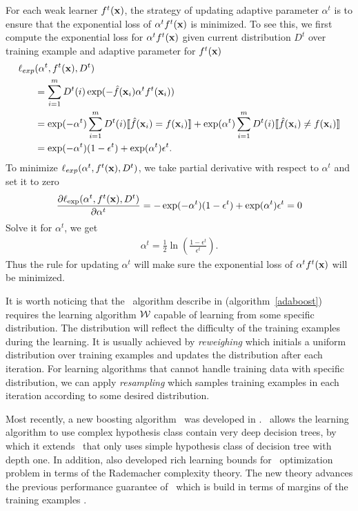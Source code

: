{For each weak learner $f^t(\mathbf {x})$, the strategy of updating adaptive parameter $\alpha^t$ is to ensure that the exponential loss of $\alpha^tf^t(\mathbf {x})$ is minimized.
To see this, we first compute the exponential loss for $\alpha^tf^t(\mathbf {x})$ given current distribution $D^t$ over training example and adaptive parameter for $f^t(\mathbf {x})$
\begin{align*}
	\ell_{exp}&(\alpha^t,f^t(\mathbf {x}),D^t) \\
	&= \sum_{i=1}^mD^t(i)\exp(-{\hat{f}}(\mathbf {x}_i)\alpha^tf^t(\mathbf {x}_i))\\
	&=\exp(-\alpha^t)\sum_{i=1}^mD^t(i){\llbracket {\hat{f}}(\mathbf {x}_i)=f(\mathbf {x}_i) \rrbracket} + \exp(\alpha^t)\sum_{i=1}^mD^t(i){\llbracket {\hat{f}}(\mathbf {x}_i)\neq f(\mathbf {x}_i) \rrbracket}\\
	&=\exp(-\alpha^t)(1-\epsilon^t) + \exp(\alpha^t)\epsilon^t.
\end{align*}
To minimize $\ell_{exp}(\alpha^t,f^t(\mathbf {x}),D^t)$, we take partial derivative with respect to $\alpha^t$ and set it to zero
\begin{align*}
	\frac{\partial\ell_{\exp}(\alpha^t,f^t(\mathbf {x}),D^t)}{\partial\alpha^t} = -\exp(-\alpha^t)(1-\epsilon^t) + \exp(\alpha^t)\epsilon^t=0
\end{align*}
Solve it for $\alpha^t$, we get
\begin{align*}
	\alpha^{t} = \frac{1}{2}\ln\left(\frac{1-\epsilon^t}{\epsilon^t}\right).
\end{align*}
Thus the rule for updating $\alpha^t$ will make sure the exponential loss of $\alpha^tf^t(\mathbf {x})$ will be minimized.

It is worth noticing that the \adaboost\ algorithm describe in (algorithm~\ref{adaboost}) requires the learning algorithm $\mathcal{W}$ capable of learning from some specific distribution.
The distribution will reflect the difficulty of the training examples during the learning.
It is usually achieved by \textit{reweighing} which initials a uniform distribution over training examples and updates the distribution after each iteration.
For learning algorithms that cannot handle training data with specific distribution, we can apply \textit{resampling} which samples training examples in each iteration according to some desired distribution.

Most recently, a new boosting algorithm \deepboosting\ was developed in \citep{Cortes14deep}.
\deepboosting\ allows the learning algorithm to use complex hypothesis class contain very deep decision trees, by which it extends \adaboost\ that only uses simple hypothesis class of decision tree with depth one.
In addition, \citet{Cortes14deep} also developed rich learning bounds for \deepboosting\ optimization problem in terms of the Rademacher complexity theory.
The new theory advances the previous performance guarantee of \adaboost\ which is build in terms of margins of the training examples \citep{Schapire97boosting,Koltchinskii00empirical}.


}
